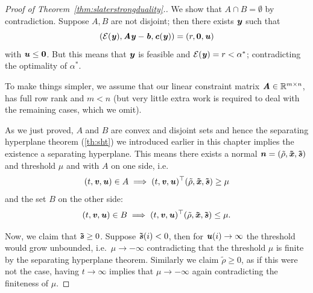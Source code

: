 {\begin{proof}[Proof of Theorem~\ref{thm:slaterstrongduality}.]
We show that $A \cap B = \emptyset$ by contradiction.
Suppose $A, B$ are not disjoint; then there exists $\boldsymbol{\mathit{y}}$ such that
\begin{equation*} (\mathcal{E}(\boldsymbol{\mathit{y}}), \boldsymbol{\mathit{A}}\boldsymbol{\mathit{y}}-\boldsymbol{\mathit{b}}, \boldsymbol{\mathit{c}}(\boldsymbol{\mathit{y}})) = (r, \boldsymbol{0}, \boldsymbol{\mathit{u}}) \end{equation*}
with $\boldsymbol{\mathit{u}} \leq \boldsymbol{0}$.
But this means that $\boldsymbol{\mathit{y}}$ is feasible and  $\mathcal{E}(\boldsymbol{\mathit{y}}) = r < \alpha^*$; contradicting the optimality of $\alpha^*$.

To make things simpler,
we assume that our linear constraint matrix $\boldsymbol{\mathit{A}} \in \mathbb{R}^{m\times n}$,
has full row rank and $m < n$ (but very little extra work is required to
deal with the remaining cases, which we omit).

As we just proved, $A$ and $B$ are convex and disjoint sets and hence the separating hyperplane theorem (\autoref{th:sht}) we introduced earlier in this chapter implies the existence a separating hyperplane.
This means there exists a normal
$\boldsymbol{\mathit{n}} = (\tilde\rho, \boldsymbol{\tilde{\mathit{x}}}, \boldsymbol{\tilde{\mathit{s}}})$ and threshold
$\mu$ and with $A$ on one side, i.e.\
\begin{equation} \label{eq:A}
(t, \boldsymbol{\mathit{v}}, \boldsymbol{\mathit{u}}) \in A \implies (t, \boldsymbol{\mathit{v}}, \boldsymbol{\mathit{u}})^{\top}(\tilde\rho, \boldsymbol{\tilde{\mathit{x}}}, \boldsymbol{\tilde{\mathit{s}}}) \geq \mu
\end{equation}
and the set $B$ on the other side:
\begin{equation} \label{eq:B}
(t, \boldsymbol{\mathit{v}}, \boldsymbol{\mathit{u}}) \in B \implies (t, \boldsymbol{\mathit{v}}, \boldsymbol{\mathit{u}})^{\top}(\tilde\rho, \boldsymbol{\tilde{\mathit{x}}}, \boldsymbol{\tilde{\mathit{s}}}) \leq \mu.
\end{equation}

Now, we claim that $\boldsymbol{\tilde{\mathit{s}}} \geq 0$. Suppose $\boldsymbol{\tilde{\mathit{s}}}(i) < 0$, then for $\boldsymbol{\mathit{u}}(i) \rightarrow \infty$ the threshold would grow unbounded, i.e.\ $\mu \rightarrow -\infty$ contradicting that the threshold $\mu$ is finite by the separating hyperplane theorem.
Similarly we claim $\tilde\rho \geq 0$, as if this were not the case, having $t \rightarrow \infty$ implies that $\mu \rightarrow -\infty$ again contradicting the finiteness of $\mu$.


\end{proof}}

